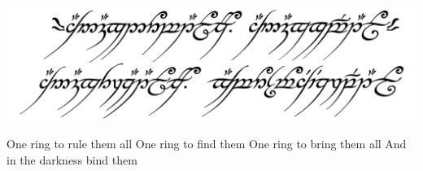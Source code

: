 \documentclass[11pt]{article}
\begin{document}
\begin{minipage}[c]{0.6\textwidth}
\begin{framed}
\includegraphics[width=\textwidth]{2000px-One_Ring_inscription}
\end{framed}
\end{minipage}
\begin{minipage}[c]{0.4\textwidth}
\begin{framed}
 One ring to rule them all \newline
 One ring to find them \newline
 One ring to bring them all \newline
 And in the darkness bind them 
\end{framed}
\end{minipage}

\end{document}
